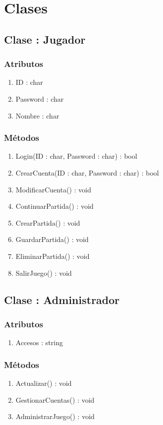 \section{Clases}\label{sec:uc0}
\subsection{Clase : Jugador}\label{sec:uc0}
\subsubsection{Atributos}
\begin{enumerate}
\item ID : char
\item Password : char
\item Nombre : char
\end{enumerate}

\subsubsection{Métodos}
\begin{enumerate}
\item Login(ID : char, Password : char) : bool
\item CrearCuenta(ID : char, Password : char) : bool
\item ModificarCuenta() : void
\item ContinuarPartida() : void
\item CrearPartida() : void
\item GuardarPartida() : void
\item EliminarPartida() : void
\item SalirJuego() : void
\end{enumerate}



\subsection{Clase : Administrador}\label{sec:uc0}
\subsubsection{Atributos}
\begin{enumerate}
\item Accesos : string
\end{enumerate}

\subsubsection{Métodos}
\begin{enumerate}
\item Actualizar() : void
\item GestionarCuentas() : void
\item AdministrarJuego() : void
\end{enumerate}



